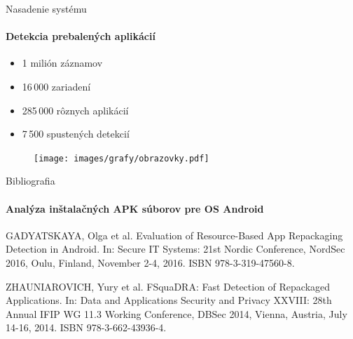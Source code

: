 \documentclass{beamer}
\begin{document}
    \begin{frame}[label=lists]{Nasadenie systému}
   	 \framesubtitle{Detekcia prebalených aplikácií}
  	\begin{itemize}
  		\item 1 milión záznamov
  		\item 16\,000 zariadení
  		\item 285\,000  rôznych aplikácií
  		\item 7\,500 spustených detekcií
  	\end{itemize}
	\begin{figure}[htb]
	  	\begin{center}
    		\texttt{[image: images/grafy/obrazovky.pdf]}
  		\end{center}
	\end{figure}
  \end{frame} 
    

  \begin{frame}[label=bibliography]{Bibliografia}
    \framesubtitle{Analýza inštalačných APK súborov pre OS Android}
    \begin{thebibliography}{9}
      GADYATSKAYA, Olga et al. Evaluation of Resource-Based App Repackaging Detection in Android. In: Secure IT Systems: 21st Nordic Conference, NordSec 2016, Oulu, Finland, November 2-4, 2016. ISBN 978-3-319-47560-8.
          
                ZHAUNIAROVICH, Yury et al. FSquaDRA: Fast Detection
of Repackaged Applications. In: Data and Applications Security and Privacy XXVIII: 28th Annual IFIP WG 11.3 Working Conference, DBSec 2014, Vienna, Austria, July 14-16, 2014. ISBN 978-3-662-43936-4.
      
    \end{thebibliography}
  \end{frame}
\end{document}
